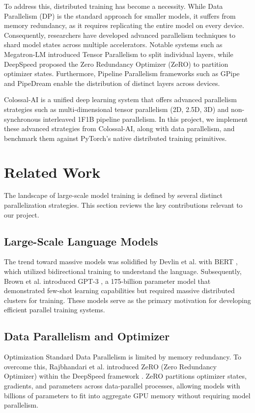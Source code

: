 \documentclass[conference]{IEEEtran}
\begin{document}
To address this, distributed training has become a necessity. While Data Parallelism (DP) is the standard approach for smaller models, it suffers from memory redundancy, as it requires replicating the entire model on every device. Consequently, researchers have developed advanced parallelism techniques to shard model states across multiple accelerators. Notable systems such as Megatron-LM \cite{DBLP:journals/corr/abs-1909-08053} introduced Tensor Parallelism to split individual layers, while DeepSpeed \cite{rajbhandari2019zero} proposed the Zero Redundancy Optimizer (ZeRO) to partition optimizer states. Furthermore, Pipeline Parallelism frameworks such as GPipe \cite{DBLP:journals/corr/abs-1811-06965} and PipeDream \cite{10.1145/3341301.3359646} enable the distribution of distinct layers across devices.

Colossal-AI \cite{10.1145/3605573.3605613} is a unified deep learning system that offers advanced parallelism strategies such as multi-dimensional tensor parallelism (2D, 2.5D, 3D) and non-synchronous interleaved 1F1B pipeline parallelism. In this project, we implement these advanced strategies from Colossal-AI, along with data parallelism, and benchmark them against PyTorch's native distributed training primitives.
\section{Related Work}
The landscape of large-scale model training is defined by several distinct parallelization strategies. This section reviews the key contributions relevant to our project.

\subsection{Large-Scale Language Models} The trend toward massive models was solidified by Devlin et al. with BERT \cite{DBLP:journals/corr/abs-1810-04805}, which utilized bidirectional training to understand the language. Subsequently, Brown et al. introduced GPT-3 \cite{DBLP:journals/corr/abs-2005-14165}, a 175-billion parameter model that demonstrated few-shot learning capabilities but required massive distributed clusters for training. These models serve as the primary motivation for developing efficient parallel training systems.

\subsection{Data Parallelism and Optimizer} Optimization Standard Data Parallelism is limited by memory redundancy. To overcome this, Rajbhandari et al. introduced ZeRO (Zero Redundancy Optimizer) within the DeepSpeed framework \cite{rasley2020deepspeed}. ZeRO partitions optimizer states, gradients, and parameters across data-parallel processes, allowing models with billions of parameters to fit into aggregate GPU memory without requiring model parallelism.
\end{document}
